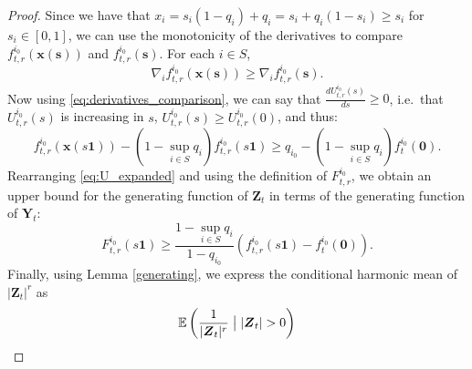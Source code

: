 \documentclass[preprint,3p,12pt]{elsarticle}
\theoremstyle{definition}
\begin{document}
\begin{proof}
Since we have that $x_i = s_i(1-q_{i}) +q_{i} = s_i + q_{i}(1-s_i)\ge s_i$ for $s_i \in [0,1]$, we can use the monotonicity of the derivatives to compare $f_{t,r}^{i_0}(\boldsymbol{x}(\boldsymbol{s}))$ and $f_{t,r}^{i_0}(\boldsymbol{s})$. For each $i \in S$,
 \begin{equation}
     \nabla_i f_{t,r}^{i_0}(\boldsymbol{x}(\boldsymbol{s})) \geq 
     \nabla_i f_{t,r}^{i_0}(\boldsymbol{s}).\label{eq:derivatives_comparison}
 \end{equation}
Now using \eqref{eq:derivatives_comparison}, we can say that
    $\frac{dU_{t,r}^{i_0}(s)}{ds} %
    \ge 0$, %
i.e.\ that $U_{t,r}^{i_0}(s)$ is increasing in $s$,
    $U_{t,r}^{i_0}(s) \ge U_{t,r}^{i_0}(0)$, and thus:
 \begin{equation}
     f_{t,r}^{i_0}(\boldsymbol{x}(s\boldsymbol{1})) - (1-\sup_{i \in S}q_i)f_{t,r}^{i_0}(s\boldsymbol{1}) \ge q_{i_0} - (1-\sup_{i \in S}q_i) f_{t}^{i_0}(\boldsymbol{0}). \label{eq:U_expanded}
 \end{equation}
 Rearranging \eqref{eq:U_expanded} and using the definition of $F_{t,r}^{i_0}$, we obtain an upper bound for the generating function of $\boldsymbol{Z}_t$ in terms of the generating function of $\boldsymbol{Y}_t$:
 \begin{equation}
     F_{t,r}^{i_0}(s\boldsymbol{1}) \ge \frac{1-\sup_{i \in S} q_i}{1-q_{i_0}}(f_{t,r}^{i_0}(s\boldsymbol{1})-f_{t}^{i_0}(\boldsymbol{0})). \label{eq:generating_functions}
 \end{equation}
 Finally, using Lemma \ref{generating}, we express the conditional harmonic mean of $|\boldsymbol{Z}_t|^r$ as
 \begin{align}
     \mathbb{E}\left(\frac{1}{|\boldsymbol{Z}_t|^r}\bigm| |\boldsymbol{Z}_t| >0\right) %

\end{align}
\end{proof}
\end{document}
